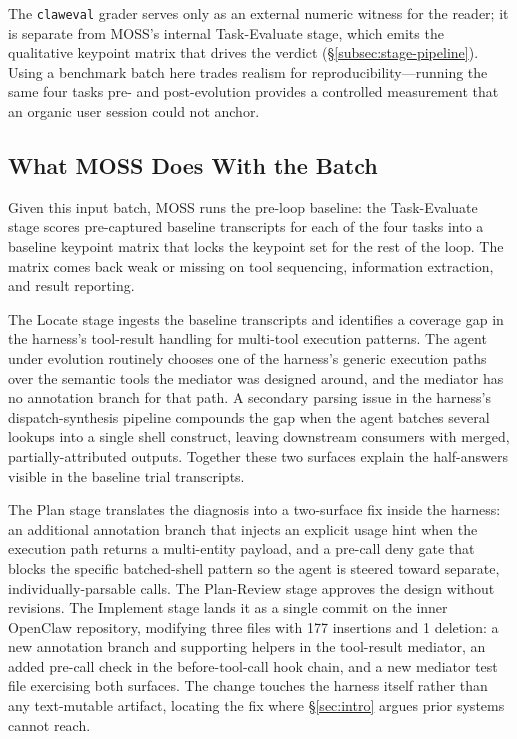 The \texttt{claweval} grader serves only as an external numeric witness for the reader; it is separate from MOSS's internal Task-Evaluate stage, which emits the qualitative keypoint matrix that drives the verdict (\S\ref{subsec:stage-pipeline}). Using a benchmark batch here trades realism for reproducibility---running the same four tasks pre- and post-evolution provides a controlled measurement that an organic user session could not anchor.

\subsection{What MOSS Does With the Batch}
\label{subsec:case-diag}

Given this input batch, MOSS runs the pre-loop baseline: the Task-Evaluate stage scores pre-captured baseline transcripts for each of the four tasks into a baseline keypoint matrix that locks the keypoint set for the rest of the loop. The matrix comes back weak or missing on tool sequencing, information extraction, and result reporting.

The Locate stage ingests the baseline transcripts and identifies a coverage gap in the harness's tool-result handling for multi-tool execution patterns. The agent under evolution routinely chooses one of the harness's generic execution paths over the semantic tools the mediator was designed around, and the mediator has no annotation branch for that path. A secondary parsing issue in the harness's dispatch-synthesis pipeline compounds the gap when the agent batches several lookups into a single shell construct, leaving downstream consumers with merged, partially-attributed outputs. Together these two surfaces explain the half-answers visible in the baseline trial transcripts.

The Plan stage translates the diagnosis into a two-surface fix inside the harness: an additional annotation branch that injects an explicit usage hint when the execution path returns a multi-entity payload, and a pre-call deny gate that blocks the specific batched-shell pattern so the agent is steered toward separate, individually-parsable calls. The Plan-Review stage approves the design without revisions. The Implement stage lands it as a single commit on the inner OpenClaw repository, modifying three files with 177 insertions and 1 deletion: a new annotation branch and supporting helpers in the tool-result mediator, an added pre-call check in the before-tool-call hook chain, and a new mediator test file exercising both surfaces. The change touches the harness itself rather than any text-mutable artifact, locating the fix where \S\ref{sec:intro} argues prior systems cannot reach.


